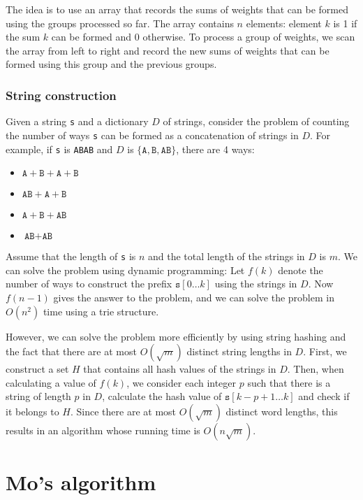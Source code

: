 The idea is to use an array that records the sums of weights
that can be formed using the groups processed so far.
The array contains $n$ elements: element $k$ is 1 if the sum
$k$ can be formed and 0 otherwise.
To process a group of weights, we scan the array
from left to right and record the new sums of weights that
can be formed using this group and the previous groups.

\subsubsection{String construction}

Given a string \texttt{s} and a dictionary $D$ of strings,
consider the problem of counting the number of ways
\texttt{s} can be formed as a concatenation of strings in $D$.
For example,
if \texttt{s} is \texttt{ABAB} and $D$ is
$\{\texttt{A},\texttt{B},\texttt{AB}\}$,
there are 4 ways:

\begin{itemize}[noitemsep]
\item $\texttt{A}+\texttt{B}+\texttt{A}+\texttt{B}$
\item $\texttt{AB}+\texttt{A}+\texttt{B}$
\item $\texttt{A}+\texttt{B}+\texttt{AB}$
\item $\texttt{AB}+\texttt{AB}$
\end{itemize}

Assume that the length of \texttt{s} is $n$
and the total length of the strings in $D$ is $m$.
We can solve the problem using dynamic programming:
Let $f(k)$ denote the number of ways to construct the prefix
$\texttt{s}[0 \ldots k]$ using the strings in $D$.
Now $f(n-1)$ gives the answer to the problem,
and we can solve the problem in $O(n^2)$ time
using a trie structure.

However, we can solve the problem more efficiently
by using string hashing and the fact that there
are at most $O(\sqrt m)$ distinct string lengths in $D$.
First, we construct a set $H$ that contains all
hash values of the strings in $D$.
Then, when calculating a value of $f(k)$,
we consider each integer $p$
such that there is a string of length $p$ in $D$,
calculate the hash value of $\texttt{s}[k-p+1 \ldots k]$
and check if it belongs to $H$.
Since there are at most $O(\sqrt m)$ distinct word lengths,
this results in an algorithm whose running time is $O(n \sqrt m)$.

\section{Mo's algorithm}

